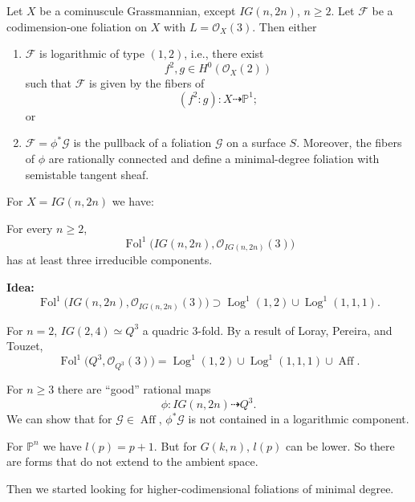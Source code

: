 \begin{theorem}
Let $X$ be a cominuscule Grassmannian,
except $IG(n,2n)$, $n\geq 2$.
Let $\mathcal{F}$ be a codimension-one
foliation on $X$ with
$L=\mathcal{O}_X(3)$.
Then either
\begin{enumerate}
\item $\mathcal{F}$ is logarithmic of type
$(1,2)$, i.e., there exist
$$
f^2,g\in H^0(\mathcal{O}_X(2))
$$
such that $\mathcal{F}$ is given by the
fibers of
$$
(f^2:g)\colon
X\dashrightarrow\mathbb{P}^1;
$$
or

\item
$\mathcal{F}=\phi^*\mathcal{G}$ is the
pullback of a foliation $\mathcal{G}$ on a
surface $S$.
Moreover, the fibers of $\phi$ are
rationally connected and define a
minimal-degree foliation with semistable
tangent sheaf.
\end{enumerate}
\end{theorem}


For $X=IG(n,2n)$ we have:

\begin{theorem}
For every $n\geq 2$,
$$
\operatorname{Fol}^1
\bigl(
IG(n,2n),
\mathcal{O}_{IG(n,2n)}(3)
\bigr)
$$
has at least three irreducible components.
\end{theorem}

\medskip\noindent
{\bf Idea:}
$$
\operatorname{Fol}^1
\bigl(
IG(n,2n),
\mathcal{O}_{IG(n,2n)}(3)
\bigr)
\supset
\operatorname{Log}^1(1,2)
\cup
\operatorname{Log}^1(1,1,1).
$$

For $n=2$, $IG(2,4)\simeq Q^3$ a
quadric 3-fold.
By a result of Loray, Pereira, and Touzet,
$$
\operatorname{Fol}^1
\bigl(Q^3,\mathcal{O}_{Q^3}(3)\bigr)
=
\operatorname{Log}^1(1,2)
\cup
\operatorname{Log}^1(1,1,1)
\cup
\operatorname{Aff}.
$$

For $n\geq 3$ there are ``good'' rational
maps
$$
\phi\colon IG(n,2n)\dashrightarrow Q^3.
$$
We can show that for
$\mathcal{G}\in\operatorname{Aff}$,
$\phi^*\mathcal{G}$ is not contained in a
logarithmic component.

\begin{remark}
For $\mathbb{P}^n$ we have
$l(p)=p+1$.
But for $G(k,n)$, $l(p)$ can be lower.
So there are forms that do not extend to
the ambient space.
\end{remark}

Then we started looking for
higher-codimensional foliations of
minimal degree.

